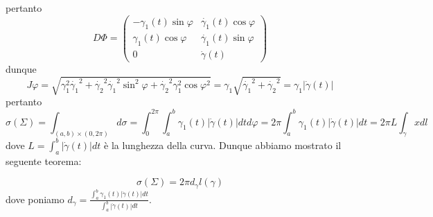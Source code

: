 pertanto
$$
D\Phi = \begin{pmatrix}
-\gamma_1(t)\sin{\varphi} & \dot{\gamma_1}(t)\cos{\varphi} \\
\gamma_1(t)\cos{\varphi} & \dot{\gamma_1}(t)\sin{\varphi} \\
0 & \dot{\gamma}(t)
\end{pmatrix}
$$
dunque
$$
J\varphi = \sqrt{\gamma_1^2 \dot{\gamma_1}^2 + \dot{\gamma_2}^2 \dot{\gamma_1}^2 \sin^2{\varphi} + \dot{\gamma_2}^2 \gamma_1^2 \cos{\varphi}^2} = \gamma_1\sqrt{\dot{\gamma_1}^2 + \dot{\gamma_2}^2} = \gamma_1 |\dot{\gamma}(t)|
$$
pertanto
$$
\sigma(\Sigma) = \int_{(a, b) \times (0, 2\pi)} d\sigma = \int_{0}^{2\pi} \int_a^b \gamma_1(t) |\dot{\gamma}(t)|dt d\varphi = 2 \pi \int_a^b \gamma_1(t) |\dot{\gamma}(t)|dt = 2 \pi L \int_\gamma x dl
$$
dove $L=\int_a^b |\dot{\gamma}(t)|dt$ è la lunghezza della curva. Dunque abbiamo mostrato il seguente teorema:
%
\vspace{0.5cm}
\begin{theorem}[\textcolor{blue}{primo teorema di Guldino}]
$$
\sigma(\Sigma) = 2\pi d_\gamma l(\gamma)
$$
dove poniamo $d_\gamma = \frac{\int_a^b \gamma_1(t) |\dot{\gamma}(t)|dt}{\int_a^b |\dot{\gamma}(t)|dt}$.
\end{theorem}
%
\vspace{0.5cm}
